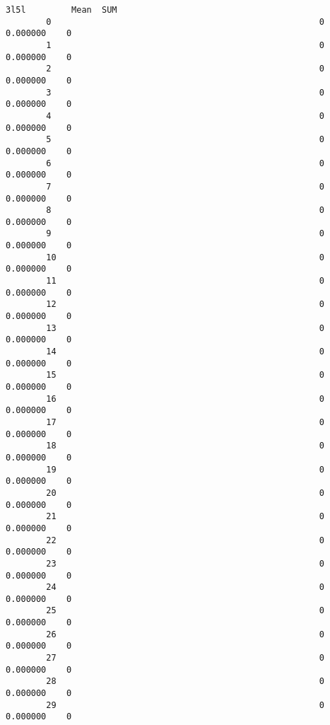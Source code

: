 \documentclass[11pt]{article}
\begin{document}
\begin{Verbatim}[commandchars=\\\{\}]
                                                           3l5l         Mean  SUM  
        0                                                     0     0.000000    0  
        1                                                     0     0.000000    0  
        2                                                     0     0.000000    0  
        3                                                     0     0.000000    0  
        4                                                     0     0.000000    0  
        5                                                     0     0.000000    0  
        6                                                     0     0.000000    0  
        7                                                     0     0.000000    0  
        8                                                     0     0.000000    0  
        9                                                     0     0.000000    0  
        10                                                    0     0.000000    0  
        11                                                    0     0.000000    0  
        12                                                    0     0.000000    0  
        13                                                    0     0.000000    0  
        14                                                    0     0.000000    0  
        15                                                    0     0.000000    0  
        16                                                    0     0.000000    0  
        17                                                    0     0.000000    0  
        18                                                    0     0.000000    0  
        19                                                    0     0.000000    0  
        20                                                    0     0.000000    0  
        21                                                    0     0.000000    0  
        22                                                    0     0.000000    0  
        23                                                    0     0.000000    0  
        24                                                    0     0.000000    0  
        25                                                    0     0.000000    0  
        26                                                    0     0.000000    0  
        27                                                    0     0.000000    0  
        28                                                    0     0.000000    0  
        29                                                    0     0.000000    0  

\end{Verbatim}
\end{document}
